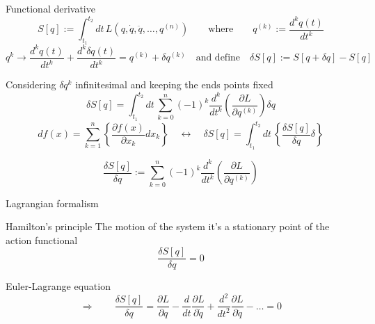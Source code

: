 \documentclass[10pt]{beamer}
\begin{document}
  \begin{frame}{Functional derivative}
    \begin{equation*}
      S[q] := \int_{t_1}^{t_2} dt \,
      L \left(q, \dot{q}, \ddot{q}, \ldots, q^{(n)} \right)
      \qquad \text{where} \qquad q^{(k)} := \frac{d^k q(t)}{dt^k}
    \end{equation*}
    \begin{equation*}
      q^{k} \rightarrow \frac{d^k q(t)}{dt^k} + \frac{d^k \delta q(t)}{dt^k} =
      q^{(k)} + \delta q^{(k)}
      \quad \text{and define} \quad
      \delta S[q] := S[q + \delta q] - S[q]
    \end{equation*}\vspace{0.2em}

    Considering $\delta q^{k}$ infinitesimal and keeping the ends points fixed
    \begin{equation*}
      \delta S[q] = \int_{t_1}^{t_2} dt \,
      \sum_{k=0}^{n} {(-1)}^k \frac{d^k}{dt^k}
      \left(\frac{\partial L}{\partial q^{(k)}}\right) \delta q
    \end{equation*}
    \begin{equation*}
      df(x) = \sum_{k=1}^{n}
      \left\{\frac{\partial f(x)}{\partial x_k} dx_k\right\}
      \quad \longleftrightarrow \quad
      \delta S[q] = \int_{t_1}^{t_2} dt \,
      \left\{ \frac{\delta S[q]}{\delta q} \delta \right\}
    \end{equation*}

    \alert{
    \begin{equation*}
      \frac{\delta S[q]}{\delta q}:=
      \sum_{k=0}^{n} {(-1)}^k \frac{d^k}{dt^k}
      \left(\frac{\partial L}{\partial q^{(k)}}\right)
    \end{equation*}
    }
  \end{frame}

  \begin{frame}{Lagrangian formalism}
    \begin{alertblock}{Hamilton's principle}
      \vspace{0.5em}
      The motion of the system it's a stationary point of the action
      functional~\cite{Goldstein11_Ham_principle}
      \begin{equation*}
        \frac{\delta S[q]}{\delta q} = 0
      \end{equation*}
    \end{alertblock}
    \begin{alertblock}{Euler-Lagrange equation}
      \vspace{0.5em}
      \begin{equation*}
        \Rightarrow \qquad
        \frac{\delta S[q]}{\delta q} =
        \frac{\partial L}{\partial q} -
        \frac{d}{dt}\frac{\partial L}{\partial \dot{q}} +
        \frac{d^2}{dt^2}\frac{\partial L}{\partial \ddot{q}} -
        \ldots = 0
      \end{equation*}
    \end{alertblock}
  \end{frame}
\end{document}
